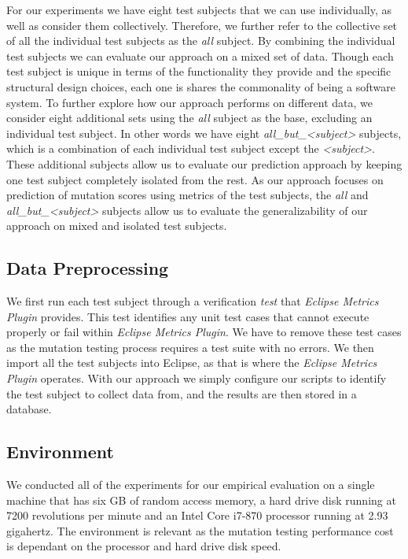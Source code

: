 For our experiments we have eight test subjects that we can use individually, as well as consider them collectively. Therefore, we further refer to the collective set of all the individual test subjects as the \emph{all} subject. By combining the individual test subjects we can evaluate our approach on a mixed set of data. Though each test subject is unique in terms of the functionality they provide and the specific structural design choices, each one is shares the commonality of being a software system. To further explore how our approach performs on different data, we consider eight additional sets using the \emph{all} subject as the base, excluding an individual test subject. In other words we have eight \emph{all\_but\_<subject>} subjects, which is a combination of each individual test subject except the \emph{<subject>}. These additional subjects allow us to evaluate our prediction approach by keeping one test subject completely isolated from the rest. As our approach focuses on prediction of mutation scores using metrics of the test subjects, the \emph{all} and \emph{all\_but\_<subject>} subjects allow us to evaluate the generalizability of our approach on mixed and isolated test subjects.


\subsection{Data Preprocessing}
\label{subsec:experiment_data_preprocessing}
We first run each test subject through a verification \emph{test} that \emph{Eclipse Metrics Plugin} provides. This test identifies any unit test cases that cannot execute properly or fail within \emph{Eclipse Metrics Plugin}. We have to remove these test cases as the mutation testing process requires a test suite with no errors. We then import all the test subjects into Eclipse, as that is where the \emph{Eclipse Metrics Plugin} operates. With our approach we simply configure our scripts to identify the test subject to collect data from, and the results are then stored in a database.


\subsection{Environment}
\label{subsec:experiment_environment}
We conducted all of the experiments for our empirical evaluation on a single machine that has six GB of random access memory, a hard drive disk running at 7200 revolutions per minute  and an Intel Core i7-870 processor running at 2.93 gigahertz. The environment is relevant as the mutation testing performance cost is dependant on the processor and hard drive disk speed.


